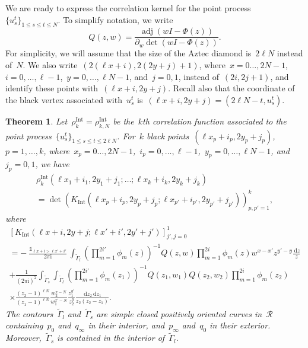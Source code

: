 \documentclass[11pt]{article}
\theoremstyle{plain}
\newtheorem{theorem}{Theorem}[section]
\theoremstyle{definition}
\numberwithin{equation}{section}
\renewcommand{\d}{\,\mathrm{d}}
\renewcommand{\i}{\mathrm{i}}
\DeclareMathOperator{\adj}{adj}
\DeclareMathOperator{\one}{\mathds{1}}
\begin{document}
We are ready to express the correlation kernel for the point process~$\{u_s^t\}_{1\leq s\leq t\leq N}$. To simplify notation, we write
\begin{equation}\label{eq:adjuagate_matrix}
Q(z,w)=\frac{\adj(wI-\Phi(z))}{\partial_w\det(wI-\Phi(z))}.
\end{equation}
For simplicity, we will assume that the size of the Aztec diamond is~$2\ell N$ instead of~$N$. We also write~$(2(\ell x+i),2(2y+j)+1)$, where~$x=0\dots,2N-1$,~$i=0,\dots,\ell-1$,~$y=0,\dots,\ell N-1$, and~$j=0,1$, instead of~$(2i,2j+1)$, and identify these points with~$(\ell x+i,2y+j)$. Recall also that the coordinate of the black vertex associated with~$u_s^t$ is~$(\ell x+i,2y+j)=(2\ell N-t,u_s^t)$.
%
\begin{theorem}\label{thm:correlation_kernel}
Let~$\rho_k^{\operatorname{Int}}=\rho_{k,N}^{\operatorname{Int}}$ be the~$k$th correlation function associated to the point process~$\{u_s^t\}_{1\leq s\leq t\leq 2\ell N}$. For~$k$ black points~$(\ell x_p+i_p,2y_p+j_p)$,~$p=1,\dots,k$, where~$x_p=0\dots,2N-1$,~$i_p=0,\dots,\ell-1$,~$y_p=0,\dots,\ell N-1$, and~$j_p=0,1$, we have
\begin{multline}
\rho_k^{\operatorname{Int}}\left(\ell x_1+i_1,2y_1+j_1;\dots;\ell x_k+i_k,2y_k+j_k\right) \\
=\det\left(K_{\operatorname{Int}}\left(\ell x_p+i_p,2y_p+j_p;\ell x_{p'}+i_{p'},2y_{p'}+j_{p'}\right)\right)_{p,p'=1}^k,
\end{multline}
where
\begin{multline}\label{eq:correlation_kernel}
\left[K_{\operatorname{Int}}(\ell x+i,2y+j;\ell x'+i',2y'+j')\right]_{j',j=0}^1 \\
= -\frac{\one_{\ell x+i>\ell x'+i'}}{2\pi\i}\int_{\tilde \Gamma_l}\left(\prod_{m=1}^{2i'}\phi_m(z)\right)^{-1}Q(z,w)\prod_{m=1}^{2i}\phi_m(z)w^{x-x'}z^{y'-y}\frac{\d z}{z} \\
+\frac{1}{(2\pi\i)^2}\int_{\tilde \Gamma_s}\int_{\tilde \Gamma_l}\left(\prod_{m=1}^{2i'}\phi_m(z_1)\right)^{-1}Q(z_1,w_1)Q(z_2,w_2)\prod_{m=1}^{2i}\phi_m(z_2) \\
\times \frac{(z_2-1)^{\ell N}}{(z_1-1)^{\ell N}}\frac{w_2^{x-N}}{w_1^{x'-N}}\frac{z_1^{y'}}{z_2^y}\frac{\d z_2\d z_1}{z_2(z_2-z_1)}.
\end{multline}
The contours~$\tilde \Gamma_l$ and~$\tilde \Gamma_s$ are simple closed positively oriented curves in~$\mathcal R$ containing~$p_0$ and~$q_\infty$ in their interior, and~$p_\infty$ and~$q_0$ in their exterior. Moreover,~$\tilde \Gamma_s$ is contained in the interior of~$\tilde \Gamma_l$. 
\end{theorem}
\end{document}
